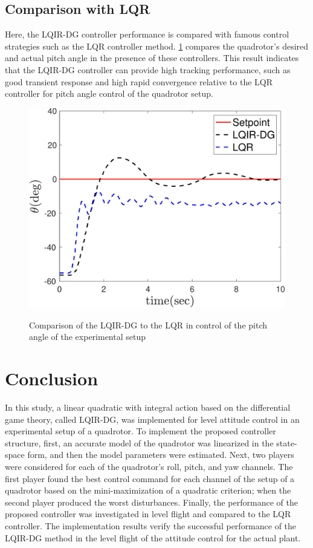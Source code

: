\documentclass[3p,times]{elsarticle}
\begin{document}
\subsection{Comparison with LQR}
\noindent Here, the LQIR-DG controller performance is compared with famous control strategies such as the LQR controller method. \figurename{\ref{fig:compare}} compares the quadrotor's desired and actual pitch angle in the presence of these controllers. This result indicates that the LQIR-DG controller can provide high tracking performance, such as good transient response and high rapid convergence relative to the LQR controller for pitch angle control of the quadrotor setup.
\begin{figure}[!h]
	\centering
	{\includegraphics[width=.49\linewidth]{../Figure/implementation/lqidgvslqr/lqidgvslqr_pitch}
	}
	\caption{Comparison of the LQIR-DG to the LQR in control of the pitch angle of the experimental setup}
	\label{fig:compare}
\end{figure}
\section{Conclusion}\label{sec:conclusion}
\noindent In this study, a linear quadratic with integral action based on the differential game theory, called LQIR-DG, was implemented for level attitude control in an experimental setup of a quadrotor. To implement the proposed controller structure, first, an accurate model of the quadrotor was linearized in the state-space form, and then the model parameters were estimated. Next, two players were considered for each of the quadrotor's roll, pitch, and yaw channels. The first player found the best control command for each channel of the setup of a quadrotor based on the mini-maximization of a quadratic criterion; when the second player produced the worst disturbances. Finally, the performance of the proposed controller was investigated in level flight and compared to the LQR controller. The implementation results verify the successful performance of the LQIR-DG method in the level flight of the attitude control for the actual plant.
\end{document}
